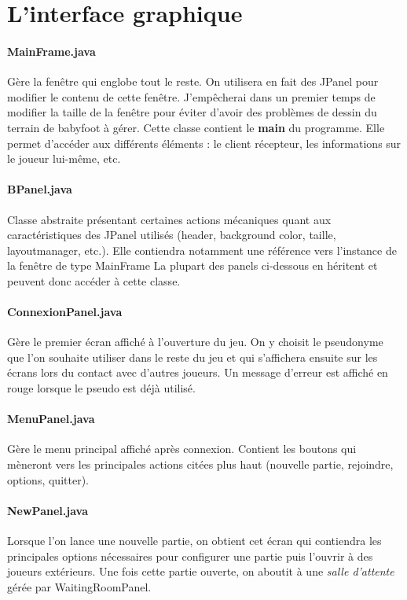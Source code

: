 \documentclass[a4paper,12pt]{report}
\begin{document}
\section{L'interface graphique}
\paragraph{MainFrame.java}
Gère la fenêtre qui englobe tout le reste. On utilisera en fait des JPanel pour modifier le contenu de cette fenêtre. J'empêcherai dans un premier temps de modifier la taille de la fenêtre pour éviter d'avoir des problèmes de dessin du terrain de babyfoot à gérer. Cette classe contient le \textbf{main} du programme. Elle permet d'accéder aux différents éléments : le client récepteur, les informations sur le joueur lui-même, etc.
\paragraph{BPanel.java}
Classe abstraite présentant certaines actions mécaniques quant aux caractéristiques des JPanel utilisés (header, background color, taille, layoutmanager, etc.). Elle contiendra notamment une référence vers l'instance de la fenêtre de type MainFrame La plupart des panels ci-dessous en héritent et peuvent donc accéder à cette classe.
\paragraph{ConnexionPanel.java}
Gère le premier écran affiché à l'ouverture du jeu. On y choisit le pseudonyme que l'on souhaite utiliser dans le reste du jeu et qui s'affichera ensuite sur les écrans lors du contact avec d'autres joueurs. Un message d'erreur est affiché en rouge lorsque le pseudo est déjà utilisé.
\paragraph{MenuPanel.java}
Gère le menu principal affiché après connexion. Contient les boutons qui mèneront vers les principales actions citées plus haut (nouvelle partie, rejoindre, options, quitter).
\paragraph{NewPanel.java}
Lorsque l'on lance une nouvelle partie, on obtient cet écran qui contiendra les principales options nécessaires pour configurer une partie puis l'ouvrir à des joueurs extérieurs. Une fois cette partie ouverte, on aboutit à une \emph{salle d'attente} gérée par WaitingRoomPanel.
\end{document}

